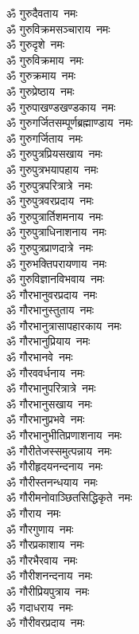 \begin{multicols}{2}
\begin{flushleft}
ॐ गुरुदैवताय~नमः\hfill{}\\
ॐ गुरुविक्रमसञ्चाराय~नमः\\
ॐ गुरुदृशे~नमः\\
ॐ गुरुविक्रमाय~नमः\\
ॐ गुरुक्रमाय~नमः\\
ॐ गुरुप्रेष्ठाय~नमः\\
ॐ गुरुपाखण्डखण्डकाय~नमः\\
ॐ गुरुगर्जितसम्पूर्णब्रह्माण्डाय~नमः\\
ॐ गुरुगर्जिताय~नमः\\
ॐ गुरुपुत्रप्रियसखाय~नमः\\
ॐ गुरुपुत्रभयापहाय~नमः\hfill{}\\
ॐ गुरुपुत्रपरित्रात्रे~नमः\\
ॐ गुरुपुत्रवरप्रदाय~नमः\\
ॐ गुरुपुत्रार्तिशमनाय~नमः\\
ॐ गुरुपुत्राधिनाशनाय~नमः\\
ॐ गुरुपुत्रप्राणदात्रे~नमः\\
ॐ गुरुभक्तिपरायणाय~नमः\\
ॐ गुरुविज्ञानविभवाय~नमः\\
ॐ गौरभानुवरप्रदाय~नमः\\
ॐ गौरभानुस्तुताय~नमः\\
ॐ गौरभानुत्रासापहारकाय~नमः\hfill{}\\
ॐ गौरभानुप्रियाय~नमः\\
ॐ गौरभानवे~नमः\\
ॐ गौरववर्धनाय~नमः\\
ॐ गौरभानुपरित्रात्रे~नमः\\
ॐ गौरभानुसखाय~नमः\\
ॐ गौरभानुप्रभवे~नमः\\
ॐ गौरभानुभीतिप्रणाशनाय~नमः\\
ॐ गौरीतेजस्समुत्पन्नाय~नमः\\
ॐ गौरीहृदयनन्दनाय~नमः\\
ॐ गौरीस्तनन्धयाय~नमः\hfill{}\\
ॐ गौरीमनोवाञ्छितसिद्धिकृते~नमः\\
ॐ गौराय~नमः\\
ॐ गौरगुणाय~नमः\\
ॐ गौरप्रकाशाय~नमः\\
ॐ गौरभैरवाय~नमः\\
ॐ गौरीशनन्दनाय~नमः\\
ॐ गौरीप्रियपुत्राय~नमः\\
ॐ गदाधराय~नमः\\
ॐ गौरीवरप्रदाय~नमः\\

\end{flushleft}
\end{multicols}
